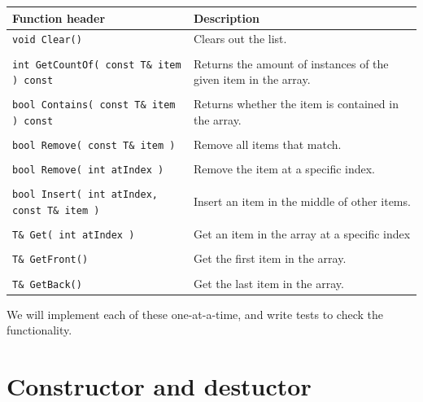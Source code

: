         \begin{center}
            \begin{tabular}{p{7cm} p{6cm}}
                \textbf{Function header} & \textbf{Description}
                \\ \hline
                \texttt{void Clear()}
                    & Clears out the list.
                \\ \\
                \texttt{int GetCountOf( const T\& item ) const}
                    & Returns the amount of instances of the given item in the array.
                \\ \\
                \texttt{bool Contains( const T\& item ) const}
                    & Returns whether the item is contained in the array.
                \\ \\
                \texttt{bool Remove( const T\& item )}
                    & Remove all items that match.
                \\ \\
                \texttt{bool Remove( int atIndex )}
                    & Remove the item at a specific index.
                \\ \\
                \texttt{bool Insert( int atIndex, const T\& item )}
                    & Insert an item in the middle of other items.
                \\ \\
                \texttt{T\& Get( int atIndex )}
                    & Get an item in the array at a specific index
                \\ \\
                \texttt{T\& GetFront()}
                    & Get the first item in the array.
                \\ \\
                \texttt{T\& GetBack()}
                    & Get the last item in the array.
            \end{tabular}
        \end{center}

        We will implement each of these one-at-a-time, and write tests
        to check the functionality.

        \section{Constructor and destuctor}

